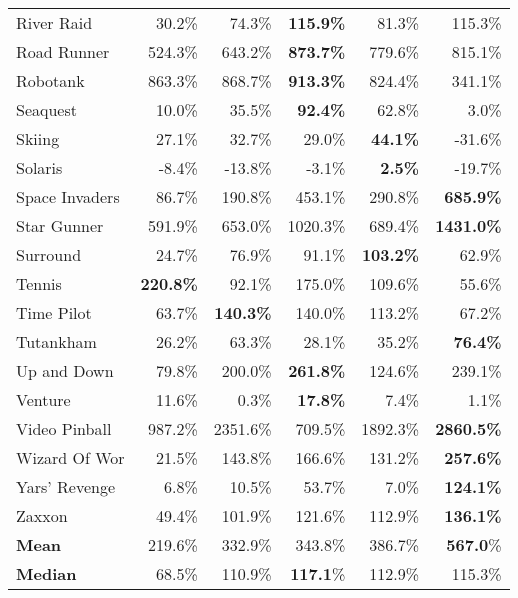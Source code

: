 \begin{table}[t]
\begin{center}
\begin{tabular}{l|rrr|rr}
          River Raid &    30.2\% &    74.3\% &{\bf115.9\%}&    81.3\% &     115.3\% \\
         Road Runner &   524.3\% &   643.2\% &{\bf873.7\%}&   779.6\% &     815.1\% \\
            Robotank &   863.3\% &   868.7\% &{\bf913.3\%}&   824.4\% &     341.1\% \\
            Seaquest &    10.0\% &    35.5\% &{\bf92.4\%}&    62.8\% &       3.0\% \\
              Skiing &    27.1\% &    32.7\% &    29.0\% &{\bf44.1\%}&     -31.6\% \\
             Solaris &    -8.4\% &   -13.8\% &    -3.1\% &{\bf2.5\%}&     -19.7\% \\
      Space Invaders &    86.7\% &   190.8\% &   453.1\% &   290.8\% &{\bf685.9\%}\\
         Star Gunner &   591.9\% &   653.0\% &  1020.3\% &   689.4\% &{\bf1431.0\%}\\
           Surround  &    24.7\% &    76.9\% &    91.1\% &{\bf103.2\%}&      62.9\% \\
              Tennis &{\bf220.8\%}&    92.1\% &   175.0\% &   109.6\% &      55.6\% \\
          Time Pilot &    63.7\% &{\bf140.3\%}&   140.0\% &   113.2\% &      67.2\% \\
           Tutankham &    26.2\% &    63.3\% &    28.1\% &    35.2\% &{\bf76.4\%}\\
         Up and Down &    79.8\% &   200.0\% &{\bf261.8\%}&   124.6\% &     239.1\% \\
             Venture &    11.6\% &     0.3\% &{\bf17.8\%}&     7.4\% &       1.1\% \\
       Video Pinball &   987.2\% &  2351.6\% &   709.5\% &  1892.3\% &{\bf2860.5\%}\\
       Wizard Of Wor &    21.5\% &   143.8\% &   166.6\% &   131.2\% &{\bf257.6\%}\\
       Yars' Revenge &     6.8\% &    10.5\% &    53.7\% &     7.0\% &{\bf124.1\%}\\
              Zaxxon &    49.4\% &   101.9\% &   121.6\% &   112.9\% &{\bf136.1\%}\\
            \hline
            {\bf Mean}   &    219.6\% & 332.9\% &  343.8\% & 386.7\% & {\bf 567.0}\%\\
            {\bf Median}   &68.5\% & 110.9\% & {\bf117.1}\% & 112.9\% & 115.3\%\\
\end{tabular}
\end{center}
\end{table}





